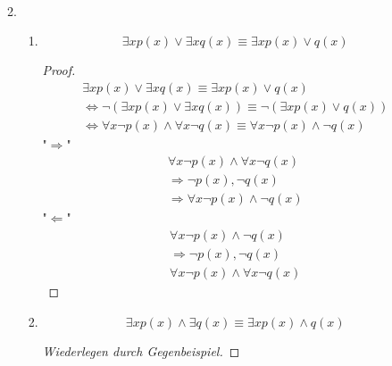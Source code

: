 \documentclass{article}
\begin{document}
\begin{enumerate}[label=\arabic*)]
\begin{enumerate}[label=\alph*)]
\begin{align}
                    \end{align}
              \item \begin{enumerate}[label=(\roman*)]
                        \item \begin{equation}
                                  \exists x p(x) \vee \exists x q(x) \equiv \exists x p(x) \vee q(x)
                              \end{equation}
                              \begin{proof}
                                  \begin{align*}
                                      \exists x p(x) \vee \exists x q(x) \equiv \exists x p(x) \vee q(x)                              \\
                                      \Leftrightarrow \neg( \exists x p(x) \vee \exists x q(x)) \equiv \neg(\exists x p(x) \vee q(x)) \\
                                      \Leftrightarrow \forall x \neg p(x) \wedge \forall x \neg q(x) \equiv \forall x \neg p(x) \wedge \neg q(x)
                                  \end{align*}
                                  "$\Rightarrow$"
                                  \begin{align*}
                                      \forall x \neg p(x) \wedge \forall x \neg q(x) \\
                                      \Rightarrow \neg p(x), \neg q(x)               \\
                                      \Rightarrow \forall x \neg p(x) \wedge \neg q(x)
                                  \end{align*}
                                  "$\Leftarrow$"
                                  \begin{align*}
                                      \forall x \neg p(x) \wedge \neg q(x) \\
                                      \Rightarrow \neg p(x), \neg q(x)     \\
                                      \forall x \neg p(x) \wedge \forall x \neg q(x)
                                  \end{align*}
                              \end{proof}
                        \item \begin{equation}
                                  \exists x p(x) \wedge \exists q(x) \equiv \exists x p(x) \wedge q(x)
                              \end{equation}
                              \begin{proof}[Wiederlegen durch Gegenbeispiel]


\end{proof}
\end{enumerate}
\end{enumerate}
\end{enumerate}
\end{document}
